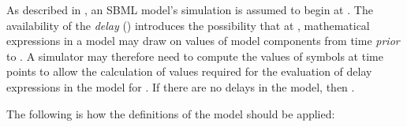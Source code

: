 As described in , an SBML model's
simulation is assumed to begin at .  The availability of
the \emph{delay}  ()
introduces the possibility that at , mathematical
expressions in a model may draw on values of model components from
time \emph{prior} to .  A simulator may therefore need to
compute the values of symbols at time points  to
allow the calculation of values required for the evaluation of
delay expressions in the model for .  If there are no
delays in the model, then .

The following is how the definitions of the model should be
applied:

